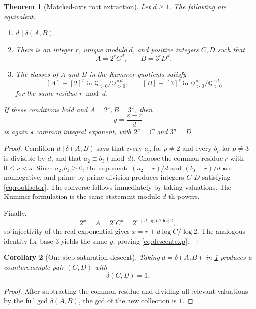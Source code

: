 \documentclass[11pt]{article}
\numberwithin{equation}{section}
\newtheorem{theorem}{Theorem}[section]
\newtheorem{corollary}[theorem]{Corollary}
\theoremstyle{definition}
\newcommand{\Q}{\mathbb{Q}}
\newcommand{\defect}{\delta}
\begin{document}
\begin{theorem}[Matched-axis root extraction]\label{thm:rootextract}
Let \(d\ge1\). The following are equivalent.
\begin{enumerate}[label=\textup{(\roman*)}]
\item \(d\mid\defect(A,B)\).
\item There is an integer \(r\), unique modulo \(d\), and positive integers \(C,D\) such that
\begin{equation}\label{eq:rootfactor}
       A=2^r C^d,\qquad B=3^r D^d.
\end{equation}
\item The classes of \(A\) and \(B\) in the Kummer quotients satisfy
\[
 [A]=[2]^r\ \text{in }\Q_{>0}^{\times}/\Q_{>0}^{\times d},
 \qquad
 [B]=[3]^r\ \text{in }\Q_{>0}^{\times}/\Q_{>0}^{\times d}
\]
for the same residue \(r\bmod d\).
\end{enumerate}
If these conditions hold and \(A=2^x,B=3^x\), then
\begin{equation}\label{eq:descentexp}
       y=\frac{x-r}{d}
\end{equation}
is again a common integral exponent, with \(2^y=C\) and \(3^y=D\).
\end{theorem}

\begin{proof}
Condition \(d\mid\defect(A,B)\) says that every \(a_p\) for \(p\ne2\) and every \(b_p\) for \(p\ne3\) is divisible by \(d\), and that \(a_2\equiv b_3\pmod d\). Choose the common residue \(r\) with \(0\le r<d\). Since \(a_2,b_3\ge0\), the exponents \((a_2-r)/d\) and \((b_3-r)/d\) are nonnegative, and prime-by-prime division produces integers \(C,D\) satisfying \eqref{eq:rootfactor}. The converse follows immediately by taking valuations. The Kummer formulation is the same statement modulo \(d\)-th powers.

Finally,
\[
  2^x=A=2^rC^d=2^{r+d\log C/\log2},
\]
so injectivity of the real exponential gives \(x=r+d\log C/\log2\). The analogous identity for base \(3\) yields the same \(y\), proving \eqref{eq:descentexp}.
\end{proof}

\begin{corollary}[One-step saturation descent]\label{cor:onestep}
Taking \(d=\defect(A,B)\) in \cref{thm:rootextract} produces a counterexample pair \((C,D)\) with
\[
       \defect(C,D)=1.
\]
\end{corollary}

\begin{proof}
After subtracting the common residue and dividing all relevant valuations by the full gcd \(\defect(A,B)\), the gcd of the new collection is \(1\).
\end{proof}
\end{document}
